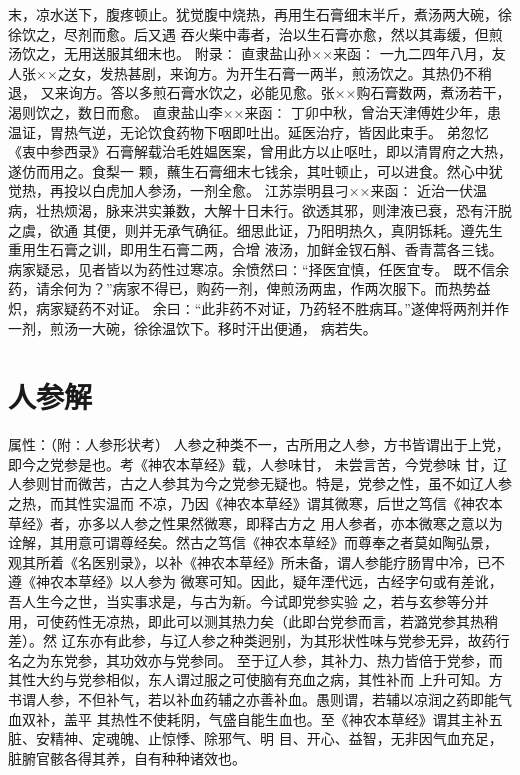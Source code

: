 \documentclass[a4paper,12pt,UTF8,twoside]{ctexbook}
\begin{document}
末，凉水送下，腹疼顿止。犹觉腹中烧热，再用生石膏细末半斤，煮汤两大碗，徐徐饮之，尽剂而愈。后又遇 
吞火柴中毒者，治以生石膏亦愈，然以其毒缓，但煎汤饮之，无用送服其细末也。 
附录∶ 
直隶盐山孙××来函∶ 
一九二四年八月，友人张××之女，发热甚剧，来询方。为开生石膏一两半，煎汤饮之。其热仍不稍退， 
又来询方。答以多煎石膏水饮之，必能见愈。张××购石膏数两，煮汤若干，渴则饮之，数日而愈。 
直隶盐山李××来函∶ 
丁卯中秋，曾治天津傅姓少年，患温证，胃热气逆，无论饮食药物下咽即吐出。延医治疗，皆因此束手。 
弟忽忆《衷中参西录》石膏解载治毛姓媪医案，曾用此方以止呕吐，即以清胃府之大热，遂仿而用之。食梨一 
颗，蘸生石膏细末七钱余，其吐顿止，可以进食。然心中犹觉热，再投以白虎加人参汤，一剂全愈。 
江苏崇明县刁××来函∶ 
近治一伏温病，壮热烦渴，脉来洪实兼数，大解十日未行。欲透其邪，则津液已衰，恐有汗脱之虞，欲通 
其便，则并无承气确征。细思此证，乃阳明热久，真阴铄耗。遵先生重用生石膏之训，即用生石膏二两，合增 
液汤，加鲜金钗石斛、香青蒿各三钱。病家疑忌，见者皆以为药性过寒凉。余愤然曰∶“择医宜慎，任医宜专。 
既不信余药，请余何为？”病家不得已，购药一剂，俾煎汤两盅，作两次服下。而热势益炽，病家疑药不对证。 
余曰∶“此非药不对证，乃药轻不胜病耳。”遂俾将两剂并作一剂，煎汤一大碗，徐徐温饮下。移时汗出便通， 
病若失。 


\chapter{人参解}
属性：（附∶人参形状考） 
人参之种类不一，古所用之人参，方书皆谓出于上党，即今之党参是也。考《神农本草经》载，人参味甘， 
未尝言苦，今党参味 
甘，辽人参则甘而微苦，古之人参其为今之党参无疑也。特是，党参之性，虽不如辽人参之热，而其性实温而 
不凉，乃因《神农本草经》谓其微寒，后世之笃信《神农本草经》者，亦多以人参之性果然微寒，即释古方之 
用人参者，亦本微寒之意以为诠解，其用意可谓尊经矣。然古之笃信《神农本草经》而尊奉之者莫如陶弘景， 
观其所着《名医别录》，以补《神农本草经》所未备，谓人参能疗肠胃中冷，已不遵《神农本草经》以人参为 
微寒可知。因此，疑年湮代远，古经字句或有差讹，吾人生今之世，当实事求是，与古为新。今试即党参实验 
之，若与玄参等分并用，可使药性无凉热，即此可以测其热力矣（此即台党参而言，若潞党参其热稍差）。然 
辽东亦有此参，与辽人参之种类迥别，为其形状性味与党参无异，故药行名之为东党参，其功效亦与党参同。 
至于辽人参，其补力、热力皆倍于党参，而其性大约与党参相似，东人谓过服之可使脑有充血之病，其性补而 
上升可知。方书谓人参，不但补气，若以补血药辅之亦善补血。愚则谓，若辅以凉润之药即能气血双补，盖平 
其热性不使耗阴，气盛自能生血也。至《神农本草经》谓其主补五脏、安精神、定魂魄、止惊悸、除邪气、明 
目、开心、益智，无非因气血充足，脏腑官骸各得其养，自有种种诸效也。 
\end{document}
